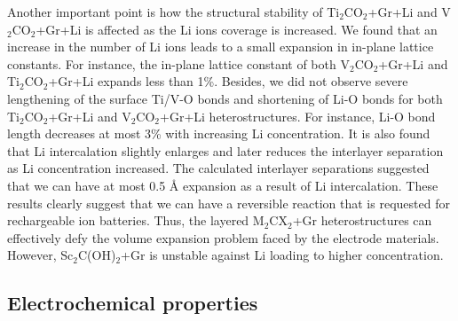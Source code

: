 Another important point is how the structural stability of Ti$_2$CO$_2$+Gr+Li and V$_2$CO$_2$+Gr+Li is affected as the Li ions coverage is increased. We found that an increase in the number of Li ions leads to a small expansion in in-plane lattice constants.  For instance, the in-plane lattice constant of both V$_2$CO$_2$+Gr+Li and Ti$_2$CO$_2$+Gr+Li expands less than 1\%.   Besides, we did not observe  severe  lengthening of the surface Ti/V-O bonds and
shortening of Li-O bonds for both Ti$_2$CO$_2$+Gr+Li and V$_2$CO$_2$+Gr+Li heterostructures. For instance,
Li-O bond length decreases at most 3\% with increasing Li concentration.   
It is also found that Li intercalation slightly enlarges and later reduces the interlayer separation as Li concentration increased. The calculated interlayer separations suggested that we can have at most 0.5 {\AA} expansion as a result of Li intercalation. 
These results clearly suggest that we can have a reversible reaction that is requested for rechargeable ion batteries. Thus, the layered M$_2$CX$_2$+Gr heterostructures can effectively defy the volume expansion problem faced by the electrode materials. However, Sc$_2$C(OH)$_2$+Gr is unstable against Li loading to higher concentration. 



\subsection{Electrochemical properties}

